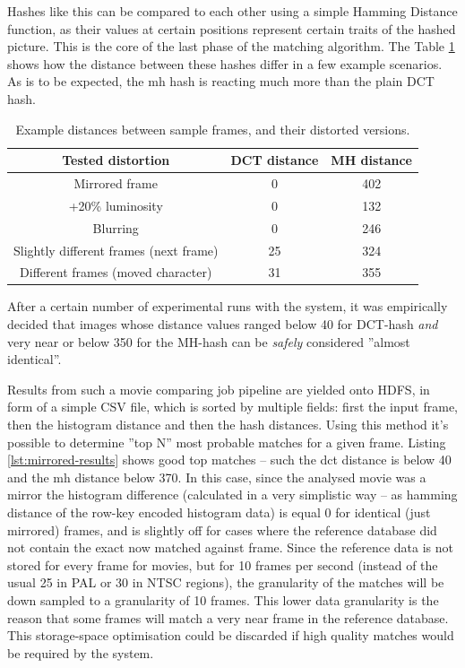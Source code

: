 Hashes like this can be compared to each other using a simple Hamming Distance \cite{hamming-distance} function, as their values at certain positions represent certain traits of the hashed picture. This is the core of the last phase of the matching algorithm. The Table \ref{tab:hash-distances} shows how the distance between these hashes differ in a few example scenarios. As is to be expected, the mh hash is reacting much more than the plain DCT hash. 

\begin{table}[ch!]
  \centering
  \begin{tabular}{|c|c|c|}
    \hline 
    \textbf{Tested distortion}             & \textbf{DCT distance} & \textbf{MH distance} \\ \hline
    Mirrored frame                         & 0                     &  402 \\ \hline
    +20\% luminosity                       & 0                     &  132 \\ \hline
    Blurring                               & 0                     &  246 \\ \hline
    Slightly different frames (next frame) & 25                    &  324 \\ \hline
    Different frames (moved character)     & 31                    &  355 \\ \hline
    
  \end{tabular}
  \caption{Example distances between sample frames, and their distorted versions.}
  \label{tab:hash-distances}
\end{table}

After a certain number of experimental runs with the system, it was empirically decided that images whose distance values ranged below 40 for DCT-hash \textit{and} very near or below 350 for the MH-hash can be \textit{safely} considered ''almost identical''.

Results from such a movie comparing job pipeline are yielded onto HDFS, in form of a simple CSV file, which is sorted by multiple fields: first the input frame, then the histogram distance and then the hash distances. Using this method it's possible to determine ''top N'' most probable matches for a given frame. Listing \ref{lst:mirrored-results} shows good top matches -- such the dct distance is below 40 and the mh distance below 370. In this case, since the analysed movie was a mirror the histogram difference (calculated in a very simplistic way -- as hamming distance of the row-key encoded histogram data) is equal 0 for identical (just mirrored) frames, and is slightly off for cases where the reference database did not contain the exact now matched against frame. Since the reference data is not stored for every frame for movies, but for 10 frames per second (instead of the usual 25 in PAL or 30 in NTSC regions), the granularity of the matches will be down sampled to a granularity of 10 frames. This lower data granularity is the reason that some frames will match a very near frame in the reference database. This storage-space optimisation could be discarded if high quality matches would be required by the system.

